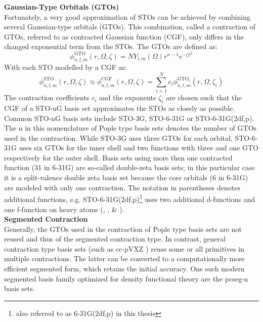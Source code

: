 \textbf{Gaussian-Type Orbitals (GTOs)}\\
Fortunately, a very good approximation of STOs can be achieved by combining several Gaussian-type orbitals (GTOs). This combination, called a contraction of GTOs, referred to as contracted Gaussian function (CGF), only differs in the changed exponential term from the STOs. The GTOs are defined as:
\begin{equation}
    \label{eq:gaussian_orbital}
    \phi_{n, l, m}^{\text{GTO}}(r, \Omega, \zeta) = N Y_{l,m}(\Omega) r^{n-1} e^{-\zeta r^2}
\end{equation}
With each STO modelled by a CGF as: 
\begin{equation}
    \phi_{n, l, m}^{\text{STO}}(r, \Omega, \zeta)  \approx \phi_{n, l, m}^{\text{CGF}}(r, \Omega, \zeta) = \sum_{i=1}^N c_i \phi_{n, l, m}^{\text{GTO}_i}(r, \Omega, \zeta_i)
\end{equation}
The contraction coefficients $c_i$ and the exponents $\zeta_i$ are chosen such that the CGF of a STO-nG basis set approximates the STOs as closely as possible. Common STO-nG basis sets include STO-3G, STO-6-31G or STO-6-31G(2df,p). \\
The n in this nomenclature of Pople type basis sets \parencite{ref:pople_basis} denotes the number of GTOs used in the contraction. While STO-3G uses three GTOs for each orbital, STO-6-31G uses six GTOs for the inner shell and two functions with three and one GTO respectively for the outer shell. Basis sets using more then one contracted function (31 in 6-31G) are so-called double-zeta basis sets; in this particular case it is a split-valence double zeta basis set because the core orbitals (6 in 6-31G) are modeled with only one contraction. The notation in parentheses denotes additional functions, e.g. STO-6-31G(2df,p)\footnote{also referred to as 6-31G(2df,p) in this thesis} uses two additional d-functions and one f-function on heavy atoms (, ,  \& ). \\

\textbf{Segmented Contraction}\\
Generally, the GTOs used in the contraction of Pople type basis sets are not reused and thus of the segmented contraction type. In contrast, general contraction type basis sets (such as cc-pVXZ \parencite{ref:cc-pVXZ}) reuse some or all primitives in multiple contractions. The latter can be converted to a computationally more efficient segmented form, which retains the initial accuracy. One such modern segmented basis family optimized for density functional theory are the pcseg-n basis sets. \parencite{ref:Jensen2014pcs}\\

